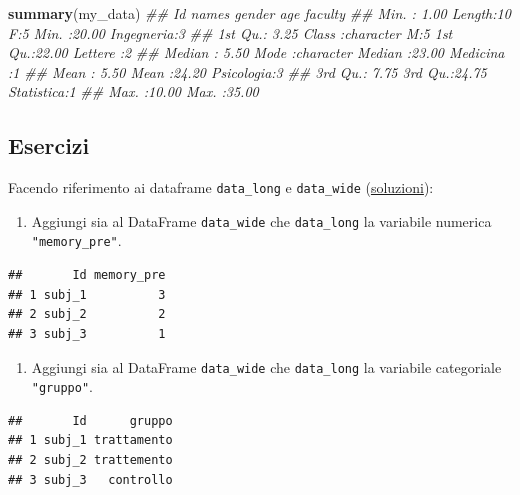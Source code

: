 \documentclass[
]{book}
\newenvironment{Shaded}{\begin{snugshade}}{\end{snugshade}}
\newcommand{\CommentTok}[1]{\textcolor[rgb]{0.56,0.35,0.01}{\textit{#1}}}
\newcommand{\KeywordTok}[1]{\textcolor[rgb]{0.13,0.29,0.53}{\textbf{#1}}}
\newcommand{\NormalTok}[1]{#1}
\providecommand{\tightlist}{%
  \setlength{\itemsep}{0pt}\setlength{\parskip}{0pt}}
\begin{document}
\begin{Shaded}
\begin{Highlighting}[]
\KeywordTok{summary}\NormalTok{(my_data)}
\CommentTok{##        Id           names           gender      age              faculty }
\CommentTok{##  Min.   : 1.00   Length:10          F:5    Min.   :20.00   Ingegneria:3  }
\CommentTok{##  1st Qu.: 3.25   Class :character   M:5    1st Qu.:22.00   Lettere   :2  }
\CommentTok{##  Median : 5.50   Mode  :character          Median :23.00   Medicina  :1  }
\CommentTok{##  Mean   : 5.50                             Mean   :24.20   Psicologia:3  }
\CommentTok{##  3rd Qu.: 7.75                             3rd Qu.:24.75   Statistica:1  }
\CommentTok{##  Max.   :10.00                             Max.   :35.00}
\end{Highlighting}
\end{Shaded}

\hypertarget{esercizi-11}{%
\subsection*{Esercizi}\label{esercizi-11}}

Facendo riferimento ai dataframe \texttt{data\_long} e \texttt{data\_wide} (\href{https://github.com/psicostat/Introduction2R/blob/master/exercises/chapter-10.R}{soluzioni}):

\begin{enumerate}
\def\labelenumi{\arabic{enumi}.}
\tightlist
\item
  Aggiungi sia al DataFrame \texttt{data\_wide} che \texttt{data\_long} la variabile numerica \texttt{"memory\_pre"}.
\end{enumerate}

\begin{verbatim}
##       Id memory_pre
## 1 subj_1          3
## 2 subj_2          2
## 3 subj_3          1
\end{verbatim}

\begin{enumerate}
\def\labelenumi{\arabic{enumi}.}
\setcounter{enumi}{1}
\tightlist
\item
  Aggiungi sia al DataFrame \texttt{data\_wide} che \texttt{data\_long} la variabile categoriale \texttt{"gruppo"}.
\end{enumerate}

\begin{verbatim}
##       Id      gruppo
## 1 subj_1 trattamento
## 2 subj_2 trattemento
## 3 subj_3   controllo
\end{verbatim}
\end{document}
